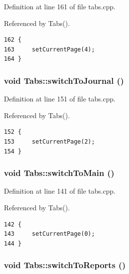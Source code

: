 Definition at line 161 of file tabs.cpp.

Referenced by Tabs().

\footnotesize\begin{verbatim}162 {
163     setCurrentPage(4);
164 }
\end{verbatim}\normalsize 


\hypertarget{classTabs_k5}{
\subsubsection[switchToJournal]{\setlength{\rightskip}{0pt plus 5cm}void Tabs::switch\-To\-Journal ()}}
\label{classTabs_k5}


Definition at line 151 of file tabs.cpp.

Referenced by Tabs().

\footnotesize\begin{verbatim}152 {
153     setCurrentPage(2);
154 }
\end{verbatim}\normalsize 


\hypertarget{classTabs_k3}{
\subsubsection[switchToMain]{\setlength{\rightskip}{0pt plus 5cm}void Tabs::switch\-To\-Main ()}}
\label{classTabs_k3}


Definition at line 141 of file tabs.cpp.

Referenced by Tabs().

\footnotesize\begin{verbatim}142 {
143     setCurrentPage(0);
144 }
\end{verbatim}\normalsize 


\hypertarget{classTabs_k6}{
\subsubsection[switchToReports]{\setlength{\rightskip}{0pt plus 5cm}void Tabs::switch\-To\-Reports ()}}
\label{classTabs_k6}


